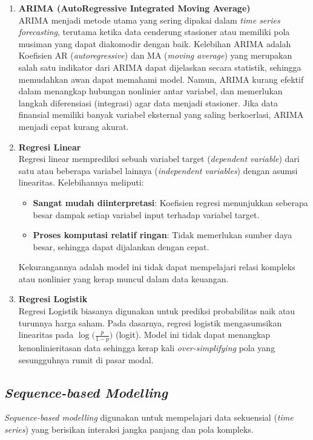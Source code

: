 \begin{enumerate}
    \item \textbf{ARIMA (AutoRegressive Integrated Moving Average)} 
    \\
    ARIMA menjadi metode utama yang sering dipakai dalam \textit{time series forecasting}, terutama ketika data cenderung stasioner atau memiliki pola musiman yang dapat diakomodir dengan baik. Kelebihan ARIMA adalah Koefisien AR (\textit{autoregressive}) dan MA (\textit{moving average}) yang merupakan salah satu indikator dari ARIMA dapat dijelaskan secara statistik, sehingga memudahkan awan dapat memahami model. Namun, ARIMA kurang efektif dalam menangkap hubungan nonlinier antar variabel, dan memerlukan langkah diferensiasi (integrasi) agar data menjadi stasioner. Jika data finansial memiliki banyak variabel eksternal yang saling berkoerlasi, ARIMA menjadi cepat kurang akurat.

    \item \textbf{Regresi Linear} 
    \\
    Regresi linear memprediksi sebuah variabel target (\textit{dependent variable}) dari satu atau beberapa variabel lainnya (\textit{independent variables}) dengan asumsi linearitas. Kelebihannya meliputi:
    \begin{itemize}
        \item \textbf{Sangat mudah diinterpretasi}: Koefisien regresi menunjukkan seberapa besar dampak setiap variabel input terhadap variabel target.
        \item \textbf{Proses komputasi relatif ringan}: Tidak memerlukan sumber daya besar, sehingga dapat dijalankan dengan cepat.
    \end{itemize}
    
    Kekurangannya adalah model ini tidak dapat mempelajari relasi kompleks atau nonlinier yang kerap muncul dalam data keuangan. 

    \item \textbf{Regresi Logistik} 
    \\
    Regresi Logistik biasanya digunakan untuk prediksi probabilitas naik atau turunnya harga saham. Pada dasarnya, regresi logistik mengasumsikan linearitas pada \(\log\bigl(\frac{p}{1-p}\bigr)\) (logit). Model ini tidak dapat menangkap kenonlinieritasan data sehingga kerap kali \textit{over-simplifying} pola yang sesungguhnya rumit di pasar modal.
\end{enumerate}

\subsection{\textit{Sequence-based Modelling}}
\textit{Sequence-based modelling} digunakan untuk mempelajari data sekuensial (\textit{time series}) yang berisikan interaksi jangka panjang dan pola kompleks. 

